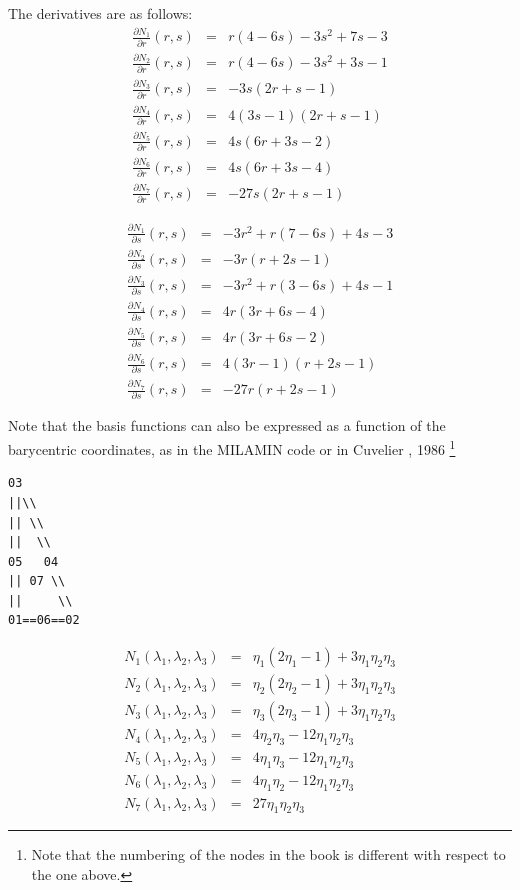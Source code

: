 The derivatives are as follows:
\begin{eqnarray}
\frac{\partial N_1}{\partial r}(r,s) &=& r(4-6s)-3s^2+7s-3\\
\frac{\partial N_2}{\partial r}(r,s) &=& r(4-6s)-3s^2+3s-1\\
\frac{\partial N_3}{\partial r}(r,s) &=& -3s(2r+s-1)  \\
\frac{\partial N_4}{\partial r}(r,s) &=& 4(3s-1)(2r+s-1) \\
\frac{\partial N_5}{\partial r}(r,s) &=& 4s(6r+3s-2) \\
\frac{\partial N_6}{\partial r}(r,s) &=& 4s(6r+3s-4)\\
\frac{\partial N_7}{\partial r}(r,s) &=& -27s(2r+s-1)
\end{eqnarray}

\begin{eqnarray}
\frac{\partial N_1}{\partial s}(r,s) &=& -3r^2+r(7-6s)+4s-3\\
\frac{\partial N_2}{\partial s}(r,s) &=& -3r(r+2s-1)\\
\frac{\partial N_3}{\partial s}(r,s) &=& -3r^2+r(3-6s)+4s-1 \\
\frac{\partial N_4}{\partial s}(r,s) &=& 4r(3r+6s-4)  \\
\frac{\partial N_5}{\partial s}(r,s) &=& 4r(3r+6s-2) \\
\frac{\partial N_6}{\partial s}(r,s) &=& 4(3r-1)(r+2s-1)\\
\frac{\partial N_7}{\partial s}(r,s) &=& -27r(r+2s-1)
\end{eqnarray}


Note that the basis functions can also be expressed as a function of the barycentric coordinates, 
as in the MILAMIN code \cite{daks08} or in Cuvelier \etal, 1986 \cite{cuss86}\footnote{Note
that the numbering of the nodes in the book is different with respect to the one above. }

\begin{verbatim}
03          
||\\        
|| \\       
||  \\      
05   04     
|| 07 \\    
||     \\   
01==06==02    
\end{verbatim}

\begin{eqnarray}
N_1(\lambda_1,\lambda_2,\lambda_3) &=& \eta_1(2\eta_1-1)+ 3\eta_1\eta_2\eta_3\\
N_2(\lambda_1,\lambda_2,\lambda_3) &=& \eta_2(2\eta_2-1)+ 3\eta_1\eta_2\eta_3\\
N_3(\lambda_1,\lambda_2,\lambda_3) &=& \eta_3(2\eta_3-1)+ 3\eta_1\eta_2\eta_3\\
N_4(\lambda_1,\lambda_2,\lambda_3) &=& 4\eta_2\eta_3 - 12\eta_1\eta_2\eta_3\\
N_5(\lambda_1,\lambda_2,\lambda_3) &=& 4\eta_1\eta_3 - 12\eta_1\eta_2\eta_3\\
N_6(\lambda_1,\lambda_2,\lambda_3) &=& 4\eta_1\eta_2 - 12\eta_1\eta_2\eta_3\\
N_7(\lambda_1,\lambda_2,\lambda_3) &=& 27\eta_1\eta_2\eta_3 
\end{eqnarray}

